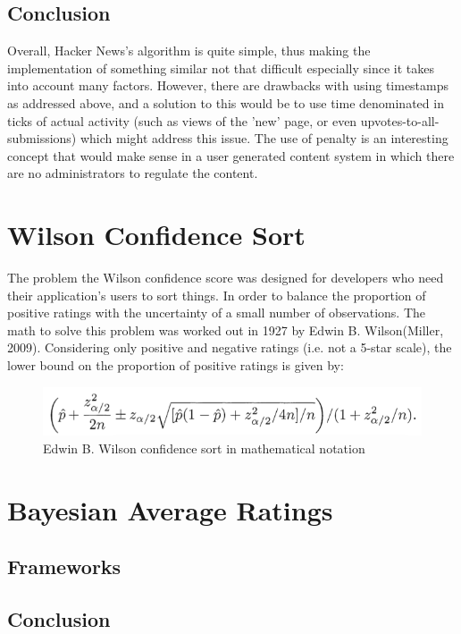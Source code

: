 \subsection {Conclusion}
Overall, Hacker News's algorithm is quite simple, thus making the implementation of something similar not that difficult especially since it takes into account many factors. However, there are drawbacks with using timestamps as addressed above, and a solution to this would be to use time denominated in ticks of actual activity (such as views of the 'new' page, or even upvotes-to-all-submissions) which might address this issue.
The use of penalty is an interesting concept that would make sense in a user generated content system in which there are no administrators to regulate the content.

\section {Wilson Confidence Sort}
The problem the Wilson confidence score was designed for developers who need their application's users to sort things. In order to balance the proportion of positive ratings with the uncertainty of a small number of observations. The math to solve this problem was worked out in 1927 by Edwin B. Wilson(Miller, 2009). Considering only positive and negative ratings (i.e. not a 5-star scale), the lower bound on the proportion of positive ratings is given by:

\begin{figure} [!htb]
  \centering
	\includegraphics{Figures/wilson_confidence}
\caption{Edwin B. Wilson confidence sort in mathematical notation}
\end{figure}

\section {Bayesian Average Ratings}
\subsection{Frameworks}

\subsection{Conclusion}
